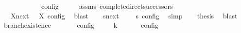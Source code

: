 \begin{isabellebody}
\ \ \ {\isacartoucheopen}{\isasymexists}{\isasymS}\ {\isacharparenleft}{\isasymS}\ {\isasymhookrightarrow}\ {\isasymS}\ {\isasymand}\ {\isacharparenleft}{\isasymrho}\ {\isasymin}\ {\isasymlbrakk}\ {\isasymS}\ {\isasymrbrakk}\isactrlsub c\isactrlsub o\isactrlsub n\isactrlsub f\isactrlsub i\isactrlsub g{\isacharparenright}{\isacartoucheclose}\isanewline
%
\isadelimproof
%
\endisadelimproof
%
\isatagproof
{}\isamarkupfalse%
\ {\isacharminus}\isanewline
\ \ \isamarkupfalse%
\ assms\ complete{\isacharunderscore}direct{\isacharunderscore}successors{\isacharprime}\ \isamarkupfalse%
\ {\isacartoucheopen}{\isasymrho}\ {\isasymin}\ {\isacharparenleft}{\isasymUnion}X{\isasymin}{\isasymC}\isactrlsub n\isactrlsub e\isactrlsub x\isactrlsub t\ {\isasymS}\ {\isasymlbrakk}\ X\ {\isasymrbrakk}\isactrlsub c\isactrlsub o\isactrlsub n\isactrlsub f\isactrlsub i\isactrlsub g{\isacharparenright}{\isacartoucheclose}\ \isamarkupfalse%
\ blast\isanewline
\ \ \isamarkupfalse%
\ {\isacartoucheopen}{\isasymexists}s{\isasymin}{\isasymC}\isactrlsub n\isactrlsub e\isactrlsub x\isactrlsub t\ {\isasymS}\ {\isasymrho}\ {\isasymin}\ {\isasymlbrakk}\ s\ {\isasymrbrakk}\isactrlsub c\isactrlsub o\isactrlsub n\isactrlsub f\isactrlsub i\isactrlsub g{\isacartoucheclose}\ \isamarkupfalse%
\ simp\isanewline
\ \ \isamarkupfalse%
\ {\isacharquery}thesis\ \isamarkupfalse%
\ blast\isanewline
{}\isamarkupfalse%
%
\endisatagproof
{\isafoldproof}%
%
\isadelimproof
\isanewline
%
\endisadelimproof
\isanewline
{}\isamarkupfalse%
\ branch{\isacharunderscore}existence{\isacharprime}{\isacharcolon}\isanewline
\ \ \ {\isacartoucheopen}{\isasymrho}\ {\isasymin}\ {\isasymlbrakk}\ {\isasymS}\ {\isasymrbrakk}\isactrlsub c\isactrlsub o\isactrlsub n\isactrlsub f\isactrlsub i\isactrlsub g{\isacartoucheclose}\isanewline
\ \ \ {\isacartoucheopen}{\isasymexists}{\isasymS}\ {\isacharparenleft}{\isasymS}\ {\isasymhookrightarrow}\isactrlbsup k\isactrlesup \ {\isasymS}\ {\isasymand}\ {\isacharparenleft}{\isasymrho}\ {\isasymin}\ {\isasymlbrakk}\ {\isasymS}\ {\isasymrbrakk}\isactrlsub c\isactrlsub o\isactrlsub n\isactrlsub f\isactrlsub i\isactrlsub g{\isacharparenright}{\isacartoucheclose}\isanewline

\end{isabellebody}
